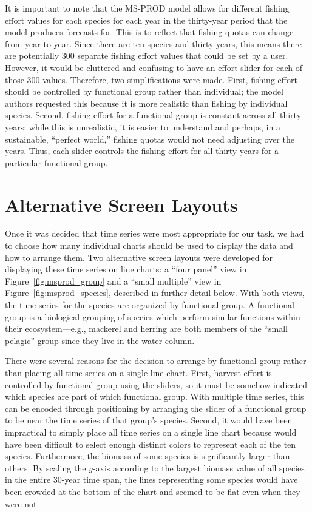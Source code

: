 It is important to note that the MS-PROD model allows for different fishing effort values for each species for each year in the thirty-year period that the model produces forecasts for.  This is to reflect that fishing quotas can change from year to year.  Since there are ten species and thirty years, this means there are potentially 300 separate fishing effort values that could be set by a user.  However, it would be cluttered and confusing to have an effort slider for each of those 300 values.  Therefore, two simplifications were made.  First, fishing effort should be controlled by functional group rather than individual; the model authors requested this because it is more realistic than fishing by individual species.  Second, fishing effort for a functional group is constant across all thirty years; while this is unrealistic, it is easier to understand and perhaps, in a sustainable, ``perfect world,'' fishing quotas would not need adjusting over the years.  Thus, each slider controls the fishing effort for all thirty years for a particular functional group.

\section{Alternative Screen Layouts}

Once it was decided that time series were most appropriate for our task, we had to choose how many individual charts should be used to display the data and how to arrange them.  Two alternative screen layouts were developed for displaying these time series on line charts: a ``four panel'' view in Figure~\ref{fig:msprod_group} and a ``small multiple'' view in Figure~\ref{fig:msprod_species}, described in further detail below.  With both views, the time series for the species are organized by functional group.  A functional group is a biological grouping of species which perform similar functions within their ecosystem---e.g., mackerel and herring are both members of the ``small pelagic'' group since they live in the water column.

There were several reasons for the decision to arrange by functional group rather than placing all time series on a single line chart.  First, harvest effort is controlled by functional group using the sliders, so it must be somehow indicated which species are part of which functional group.  With multiple time series, this can be encoded through positioning by arranging the slider of a functional group to be near the time series of that group's species.  Second, it would have been impractical to simply place all time series on a single line chart because would have been difficult to select enough distinct colors to represent each of the ten species.  Furthermore, the biomass of some species is significantly larger than others.  By scaling the $y$-axis according to the largest biomass value of all species in the entire 30-year time span, the lines representing some species would have been crowded at the bottom of the chart and seemed to be flat even when they were not.

